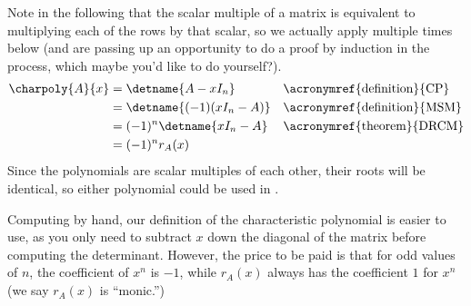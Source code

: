 Note in the following that the scalar multiple of a matrix is equivalent to multiplying each of the rows by that scalar, so we actually apply  multiple times below (and are passing up an opportunity to do a proof by induction in the process, which maybe you'd like to do yourself?).
%
\begin{align*}
\charpoly{A}{x}
&=\detname{A-xI_n}&&\text{\acronymref{definition}{CP}}\\
&=\detname{(-1)(xI_n-A)}&&\text{\acronymref{definition}{MSM}}\\
&=(-1)^{n}\detname{xI_n-A}&&\text{\acronymref{theorem}{DRCM}}\\
&=(-1)^{n}r_A(x)
\end{align*}
%
Since the polynomials are scalar multiples of each other, their roots will be identical, so either polynomial could be used in .\par
%
Computing by hand, our definition of the characteristic polynomial is easier to use, as you only need to subtract $x$ down the diagonal of the matrix before computing the determinant.  However, the price to be paid is that for odd values of $n$, the coefficient of $x^{n}$ is $-1$, while $r_A(x)$ always has the coefficient $1$ for $x^{n}$ (we say $r_A(x)$ is ``monic.'')